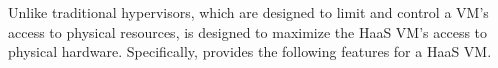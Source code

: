 %
%
%

Unlike traditional hypervisors, which are designed to limit and control a VM's 
access to physical resources, \na is designed to maximize the HaaS VM's 
access to physical hardware.
Specifically, \na provides the following features for a HaaS VM. 
